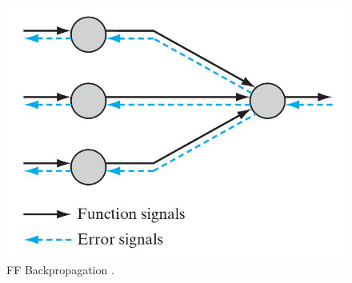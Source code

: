 \begin{figure}[!htb]
\centering
\includegraphics[width=.50\columnwidth]{images/112ffbp}
\caption[\acs{FF} Backpropagation]{\acs{FF} Backpropagation
\cite{RefWorks:158}.}
\label{fig:112ffbp}
\end{figure}
